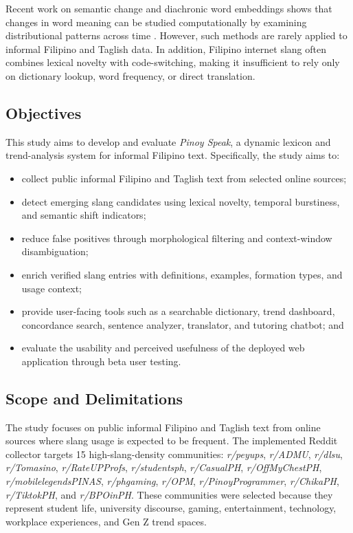 Recent work on semantic change and diachronic word embeddings
shows that changes in word meaning can be studied
computationally by examining distributional patterns across
time \cite{b7,b8,b9}. However, such methods are rarely applied
to informal Filipino and Taglish data. In addition, Filipino
internet slang often combines lexical novelty with
code-switching, making it insufficient to rely only on
dictionary lookup, word frequency, or direct translation.

\subsection{Objectives}

This study aims to develop and evaluate \textit{Pinoy Speak}, a
dynamic lexicon and trend-analysis system for informal Filipino
text. Specifically, the study aims to:

\begin{itemize}
    \item collect public informal Filipino and Taglish text from
          selected online sources;
    \item detect emerging slang candidates using lexical novelty,
          temporal burstiness, and semantic shift indicators;
    \item reduce false positives through morphological filtering
          and context-window disambiguation;
    \item enrich verified slang entries with definitions,
          examples, formation types, and usage context;
    \item provide user-facing tools such as a searchable
          dictionary, trend dashboard, concordance search,
          sentence analyzer, translator, and tutoring chatbot;
          and
    \item evaluate the usability and perceived usefulness of the
          deployed web application through beta user testing.
\end{itemize}

\subsection{Scope and Delimitations}

The study focuses on public informal Filipino and Taglish text
from online sources where slang usage is expected to be
frequent. The implemented Reddit collector targets 15
high-slang-density communities: \textit{r/peyups},
\textit{r/ADMU}, \textit{r/dlsu}, \textit{r/Tomasino},
\textit{r/RateUPProfs}, \textit{r/studentsph},
\textit{r/CasualPH}, \textit{r/OffMyChestPH},
\textit{r/mobilelegendsPINAS}, \textit{r/phgaming},
\textit{r/OPM}, \textit{r/PinoyProgrammer},
\textit{r/ChikaPH}, \textit{r/TiktokPH}, and
\textit{r/BPOinPH}. These communities were selected because
they represent student life, university discourse, gaming,
entertainment, technology, workplace experiences, and Gen Z
trend spaces.


